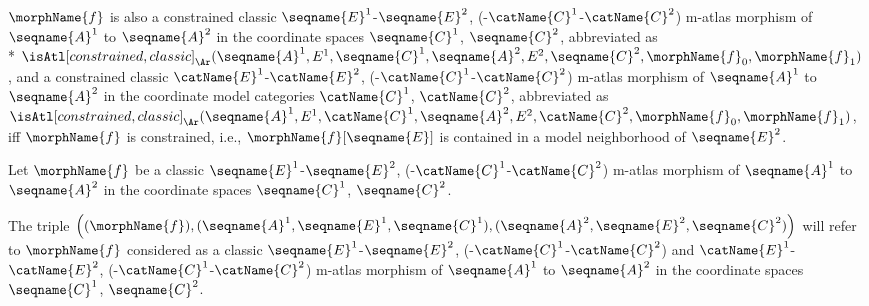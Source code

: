 \documentclass{article}
\begin{document}
\begin{definition}
$\morphName{f}$ is also a constrained classic
\nobreaks
  {
    {$\seqname{E}^1$-$\seqname{E}^2$},
    {(-$\catName{C}^1$-$\catName{C}^2$)}
  }
m-atlas
morphism of $\seqname{A}^1$ to $\seqname{A}^2$ in the coordinate spaces
$\seqname{C}^1$, $\seqname{C}^2$, abbreviated as \\*
$
  \isAtl[constrained,classic]_\Ar
    (
      \seqname{A}^1,
      E^1,
      \seqname{C}^1,
      \seqname{A}^2,
      E^2,
      \seqname{C}^2,
      \morphName{f}_0,
      \morphName{f}_1
    )
$,
and a constrained classic
\nobreaks
  {
    {$\catName{E}^1$-$\catName{E}^2$},
    {(-$\catName{C}^1$-$\catName{C}^2$)}
  }
m-atlas morphism of
$\seqname{A}^1$ to $\seqname{A}^2$ in the coordinate model categories
$\catName{C}^1$, $\catName{C}^2$, abbreviated as
$
  \isAtl[constrained,classic]_\Ar
    (
      \seqname{A}^1,
      E^1,
      \catName{C}^1,
      \seqname{A}^2,
      E^2,
      \catName{C}^2,
      \morphName{f}_0,
      \morphName{f}_1
    )
$,
iff $\morphName{f}$ is constrained, i.e.,
$\morphName{f}[\seqname{E}]$ is contained in a model neighborhood of
$\seqname{E}^2$.

Let $\morphName{f}$ be a classic
\nobreaks
  {
    {$\seqname{E}^1$-$\seqname{E}^2$},
    {(-$\catName{C}^1$-$\catName{C}^2$)}
  }
m-atlas morphism of $\seqname{A}^1$ to $\seqname{A}^2$ in the
coordinate spaces $\seqname{C}^1$, $\seqname{C}^2$.

The triple
$
  \Bigl (
    (\morphName{f}),
    (\seqname{A}^1, \seqname{E}^1, \seqname{C}^1),
    (\seqname{A}^2, \seqname{E}^2, \seqname{C}^2)
  \Bigr )
$
will refer to $\morphName{f}$ considered as a classic
\nobreaks
  {
    {$\seqname{E}^1$-$\seqname{E}^2$},
    {(-$\catName{C}^1$-$\catName{C}^2$)}
  }
and
\nobreaks
  {
    {$\catName{E}^1$-$\catName{E}^2$},
    {(-$\catName{C}^1$-$\catName{C}^2$)}
  }
m-atlas morphism of $\seqname{A}^1$ to $\seqname{A}^2$ in the coordinate
spaces $\seqname{C}^1$, $\seqname{C}^2$.
\end{definition}
\end{document}
